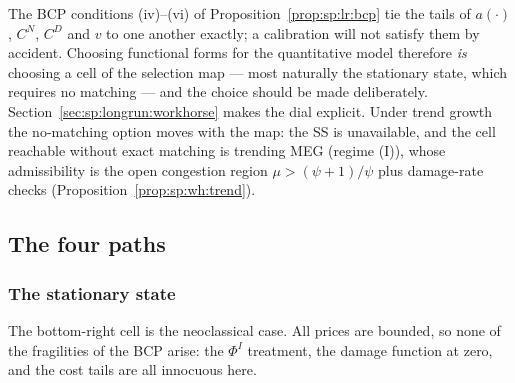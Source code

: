 \begin{remark}\label{rem:sp:lr:knife}
The BCP conditions (iv)--(vi) of Proposition~\ref{prop:sp:lr:bcp} tie the tails of
$a\left(\cdot\right)$, $C^N$, $C^D$ and $v$ to one another exactly; a calibration will not
satisfy them by accident. Choosing functional forms for the quantitative model therefore
\emph{is} choosing a cell of the selection map --- most naturally the stationary state, which
requires no matching --- and the choice should be made deliberately.
Section~\ref{sec:sp:longrun:workhorse} makes the dial explicit. Under trend growth the
no-matching option moves with the map: the SS is unavailable, and the cell reachable without
exact matching is trending MEG (regime (I)), whose admissibility is the open congestion
region $\mu>\left(\psi+1\right)/\psi$ plus damage-rate checks
(Proposition~\ref{prop:sp:wh:trend}).
\end{remark}

\subsection{The four paths}\label{sec:sp:longrun:paths}

\subsubsection{The stationary state}\label{sec:sp:longrun:path:sss}

The bottom-right cell is the neoclassical case. All prices are bounded, so none of the
fragilities of the BCP arise: the $\Phi^I$ treatment, the damage function at zero, and the cost
tails are all innocuous here.

